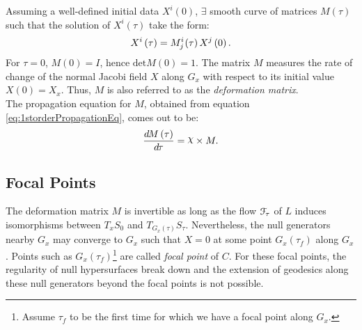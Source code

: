\documentclass[12pt, a4paper]{report}
\theoremstyle{bfnote}
\newcommand{\chits}{\raisebox{0.5ex}{$\chi$}} %
\begin{document}
Assuming a well-defined initial data $X^i\left(0\right)$, $\exists$ smooth curve
of matrices $M\left(\tau\right)$ such that the solution of
$X^i\left(\tau\right)$ take the form:
\begin{equation}{\label{eq:GeneralSolutiontoX}}
    X^i\left(\tau\right) = M^i_j\hspace{-0.1em}\left(\tau\right)X^j\left(0\right).
\end{equation}
For $\tau = 0$, $M\left(0\right) = I$, hence $\mathrm{det}M\left(0\right) = 1$.
The matrix $M$ measures the rate of change of the normal Jacobi field $X$ along
$G_x$ with respect to its initial value $X\left(0\right) = X_x$. Thus, $M$ is
also referred to as the \textit{deformation matrix}.\\
The propagation equation for $M$, obtained from equation
\eqref{eq:1storderPropagationEq}, comes out to be:
\begin{equation}{\label{eq:PropagationEqM}}
    \frac{d\hspace{-0.1em}M\left(\tau\right)}{d\hspace{-0.1em}\tau} = \chits \times M.
\end{equation}

\subsection{Focal Points}
The deformation matrix $M$ is invertible as long as the flow
$\mathcal{F}_{\hspace{-0.1em}\tau}$ of $L$ induces isomorphisms between $T_x
S_0$ and $T_{G_x\left(\tau\right)}S_\tau$. Nevertheless, the null generators
nearby $G_x$ may converge to $G_x$ such that $X = 0$ at some point
$G_x\left(\tau_f\right)$ along $G_x$. Points such as
$G_x\left(\tau_f\right)$\footnote[8]{Assume $\tau_f$ to be the first time for
which we have a focal point along $G_x$.} are called \textit{focal point} of
$C$. For these focal points, the regularity of null hypersurfaces break down and
the extension of geodesics along these null generators beyond the focal points
is not possible.\\
\end{document}
